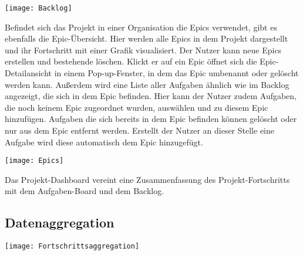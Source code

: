 \vspace{20pt}
\begin{center}
    \begin{minipage}{\linewidth}
        \texttt{[image: Backlog]}
    \end{minipage}
\end{center}
\vspace{20pt}

Befindet sich das Projekt in einer Organisation die Epics verwendet, gibt es ebenfalls die Epic-Übersicht. Hier werden alle Epics in dem Projekt dargestellt und ihr Fortschritt mit einer Grafik visualisiert. Der Nutzer kann neue Epics erstellen und bestehende löschen. Klickt er auf ein Epic öffnet sich die Epic-Detailansicht in einem Pop-up-Fenster, in dem das Epic umbenannt oder gelöscht werden kann. Außerdem wird eine Liste aller Aufgaben ähnlich wie im Backlog angezeigt, die sich in dem Epic befinden. Hier kann der Nutzer zudem Aufgaben, die noch keinem Epic zugeordnet wurden, auswählen und zu diesem Epic hinzufügen. Aufgaben die sich bereits in dem Epic befinden können gelöscht oder nur aus dem Epic entfernt werden. Erstellt der Nutzer an dieser Stelle eine Aufgabe wird diese automatisch dem Epic hinzugefügt.

\vspace{20pt}
\begin{center}
    \begin{minipage}{\linewidth}
        \texttt{[image: Epics]}
    \end{minipage}
\end{center}
\vspace{20pt}

Das Projekt-Dashboard vereint eine Zusammenfassung des Projekt-Fortschritts mit dem Aufgaben-Board und dem Backlog.

\subsection{Datenaggregation}

\vspace{20pt}
\begin{center}
    \begin{minipage}{0.8\linewidth}
        \texttt{[image: Fortschrittsaggregation]}
    \end{minipage}
\end{center}
\vspace{20pt}

